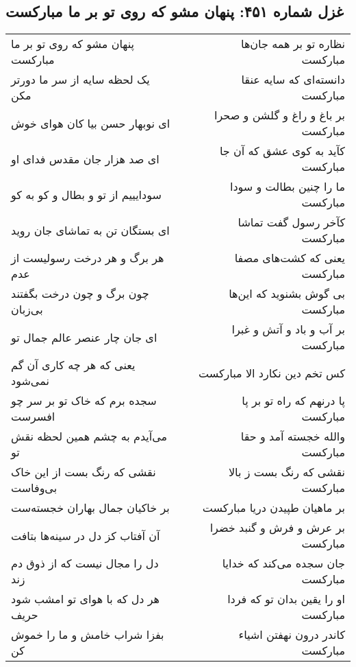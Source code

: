 \begin{center}
\section*{غزل شماره ۴۵۱: پنهان مشو که روی تو بر ما مبارکست}
\label{sec:0451}
\begin{longtable}{l p{0.5cm} r}
پنهان مشو که روی تو بر ما مبارکست
&&
نظاره تو بر همه جان‌ها مبارکست
\\
یک لحظه سایه از سر ما دورتر مکن
&&
دانسته‌ای که سایه عنقا مبارکست
\\
ای نوبهار حسن بیا کان هوای خوش
&&
بر باغ و راغ و گلشن و صحرا مبارکست
\\
ای صد هزار جان مقدس فدای او
&&
کآید به کوی عشق که آن جا مبارکست
\\
سودایییم از تو و بطال و کو به کو
&&
ما را چنین بطالت و سودا مبارکست
\\
ای بستگان تن به تماشای جان روید
&&
کآخر رسول گفت تماشا مبارکست
\\
هر برگ و هر درخت رسولیست از عدم
&&
یعنی که کشت‌های مصفا مبارکست
\\
چون برگ و چون درخت بگفتند بی‌زبان
&&
بی گوش بشنوید که این‌ها مبارکست
\\
ای جان چار عنصر عالم جمال تو
&&
بر آب و باد و آتش و غبرا مبارکست
\\
یعنی که هر چه کاری آن گم نمی‌شود
&&
کس تخم دین نکارد الا مبارکست
\\
سجده برم که خاک تو بر سر چو افسرست
&&
پا درنهم که راه تو بر پا مبارکست
\\
می‌آیدم به چشم همین لحظه نقش تو
&&
والله خجسته آمد و حقا مبارکست
\\
نقشی که رنگ بست از این خاک بی‌وفاست
&&
نقشی که رنگ بست ز بالا مبارکست
\\
بر خاکیان جمال بهاران خجسته‌ست
&&
بر ماهیان طپیدن دریا مبارکست
\\
آن آفتاب کز دل در سینه‌ها بتافت
&&
بر عرش و فرش و گنبد خضرا مبارکست
\\
دل را مجال نیست که از ذوق دم زند
&&
جان سجده می‌کند که خدایا مبارکست
\\
هر دل که با هوای تو امشب شود حریف
&&
او را یقین بدان تو که فردا مبارکست
\\
بفزا شراب خامش و ما را خموش کن
&&
کاندر درون نهفتن اشیاء مبارکست
\\
\end{longtable}
\end{center}
